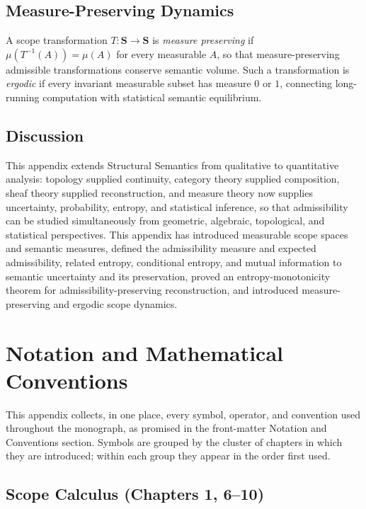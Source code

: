 \documentclass[11pt,twoside,openright]{book}
\numberwithin{equation}{chapter}
\theoremstyle{definition}
\theoremstyle{plain}
\theoremstyle{remark}
\theoremstyle{definition}
\newcommand{\Scope}{\mathbf{S}}
\begin{document}
\section{Measure-Preserving Dynamics}

A scope transformation $T:\Scope\to\Scope$ is \emph{measure preserving}
if $\mu(T^{-1}(A))=\mu(A)$ for every measurable $A$, so that
measure-preserving admissible transformations conserve semantic volume.
Such a transformation is \emph{ergodic} if every invariant measurable
subset has measure $0$ or $1$, connecting long-running computation with
statistical semantic equilibrium.

\section{Discussion}

This appendix extends Structural Semantics from qualitative to
quantitative analysis: topology supplied continuity, category theory
supplied composition, sheaf theory supplied reconstruction, and measure
theory now supplies uncertainty, probability, entropy, and statistical
inference, so that admissibility can be studied simultaneously from
geometric, algebraic, topological, and statistical perspectives. This
appendix has introduced measurable scope spaces and semantic measures,
defined the admissibility measure and expected admissibility, related
entropy, conditional entropy, and mutual information to semantic
uncertainty and its preservation, proved an entropy-monotonicity theorem
for admissibility-preserving reconstruction, and introduced
measure-preserving and ergodic scope dynamics.

\chapter{Notation and Mathematical Conventions}
\label{app:notation}

This appendix collects, in one place, every symbol, operator, and
convention used throughout the monograph, as promised in the front-matter
Notation and Conventions section. Symbols are grouped by the cluster of
chapters in which they are introduced; within each group they appear in
the order first used.

\section{Scope Calculus (Chapters 1, 6--10)}
\end{document}
